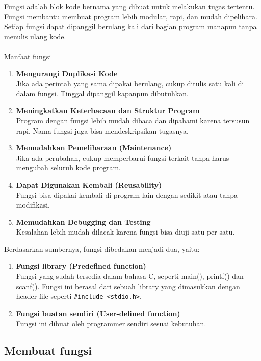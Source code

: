 Fungsi adalah blok kode bernama yang dibuat untuk melakukan tugas tertentu.
Fungsi membantu membuat program lebih modular, rapi, dan mudah dipelihara.
Setiap fungsi dapat dipanggil berulang kali dari bagian program manapun tanpa menulis ulang kode.
\\\\Manfaat fungsi
\begin{enumerate}
    \item \textbf{Mengurangi Duplikasi Kode} \\
    Jika ada perintah yang sama dipakai berulang, cukup ditulis satu kali di dalam fungsi.
    Tinggal dipanggil kapanpun dibutuhkan.
    \item \textbf{Meningkatkan Keterbacaan dan Struktur Program} \\
    Program dengan fungsi lebih mudah dibaca dan dipahami karena tersusun rapi.
    Nama fungsi juga bisa mendeskripsikan tugasnya.
    \item \textbf{Memudahkan Pemeliharaan (Maintenance)} \\
    Jika ada perubahan, cukup memperbarui fungsi terkait tanpa harus mengubah seluruh kode program.
    \item \textbf{Dapat Digunakan Kembali (Reusability)} \\
    Fungsi bisa dipakai kembali di program lain dengan sedikit atau tanpa modifikasi.
    \item \textbf{Memudahkan Debugging dan Testing} \\
    Kesalahan lebih mudah dilacak karena fungsi bisa diuji satu per satu.
\end{enumerate}
Berdasarkan sumbernya, fungsi dibedakan menjadi dua, yaitu:
\begin{enumerate}
    \item \textbf{Fungsi library (Predefined function)} \\
    Fungsi yang sudah tersedia dalam bahasa C, seperti main(), printf() dan scanf().
    Fungsi ini berasal dari sebuah library yang dimasukkan dengan header file seperti \verb|#include <stdio.h>|.
    \item \textbf{Fungsi buatan sendiri (User-defined function)} \\
    Fungsi ini dibuat oleh programmer sendiri sesuai kebutuhan.
\end{enumerate}

\subsection{Membuat fungsi}

